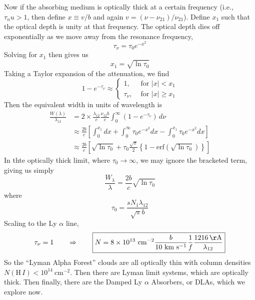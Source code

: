 \documentclass[10pt]{article}
\numberwithin{equation}{section}
\newcommand{\n}{\noindent}
\newcommand{\abs}[1]{\left\vert#1\right\vert}
\begin{document}
\n Now if the absorbing medium is optically thick at a certain frequency (i.e.,
$\tau_nu > 1$, then define $x\equiv v/b$ and again $v = (\nu -
\nu_{21})/\nu_{21}$). Define $x_1$ such that the optical depth is unity at that
frequency. The optical depth dies off exponentially as we move away from the
resonance frequency,
\begin{equation}
  \label{eq:ew:11}\tau_\nu = \tau_0 e^{-x^2}
\end{equation}
Solving for $x_1$ then gives us
\begin{equation}
  \label{eq:ew:12} x_1 = \sqrt{\ln \tau_0}
\end{equation}
Taking a Taylor expansion of the attenuation, we find
\begin{equation}
  \label{eq:ew:13} 1-e^{-\tau_\nu} \approx \begin{cases}
    1, &\text{ for }\abs{x} < x_1\\
    \tau_\nu, &\text{ for }\abs{x} \geq x_1
  \end{cases}
\end{equation}
Then the equivalent width in units of wavelength is
\begin{align}
  \label{eq:ew:14} \frac{W(\lambda)}{\lambda_{12}} &= 2\times
  \frac{\lambda_{12}}{c} \frac{\nu_{12}b}{c} \int_0^\infty
  (1-e^{-\tau_\nu})\,d\nu\\
  \label{eq:ew:15} &\approx \frac{2b}{c}\left[ \int_0^{x_1}dx + \int_0^\infty
  \tau_0e^{-x^2}dx - \int_0^{x_1}\tau_0e^{-x^2}dx\right]\\
  \label{eq:ew:16} &\approx \frac{2b}{c} \left[\sqrt{\ln\tau_0} +
  \tau_0\frac{\sqrt{\pi}}{2}\left\{1 -
  \mathrm{erf}\left(\sqrt{\ln\tau_0}\right)\right\}\right]
\end{align}
In thte optically thick limit, where $\tau_0\to\infty$, we may ignore the
bracketed term, giving us simply
\begin{equation}
  \label{eq:ew:17} \boxed{\frac{W_\lambda}{\lambda} =
  \frac{2b}{c}\sqrt{\ln\tau_0}}
\end{equation}
where
\begin{equation}
  \label{eq:ew:18} \tau_0 = \frac{s N_1 \lambda_{12}}{\sqrt{\pi} b}
\end{equation}
Scaling to the Ly $\alpha$ line, 
\begin{equation}
  \label{eq:ew:19} \tau_\nu = 1 \qquad \Rightarrow \qquad \boxed{N = 8\times
  10^{13}\ \mathrm{cm^{-2}}\frac{b}{10\ \mathrm{km\ s^{-1}}}\frac{1}{f}
  \frac{1216\,\mathrm{\AA}}{\lambda_{12}}}
\end{equation}
So the ``Lyman Alpha Forest'' clouds are all optically thin with column
densities $N(\mathrm{H}\,I) < 10^{14}\ \mathrm{cm^{-2}}$. Then there are Lyman
limit systems, which are optically thick. Then finally, there are the Damped Ly
$\alpha$ Absorbers, or DLAs, which we explore now.\\
\end{document}
